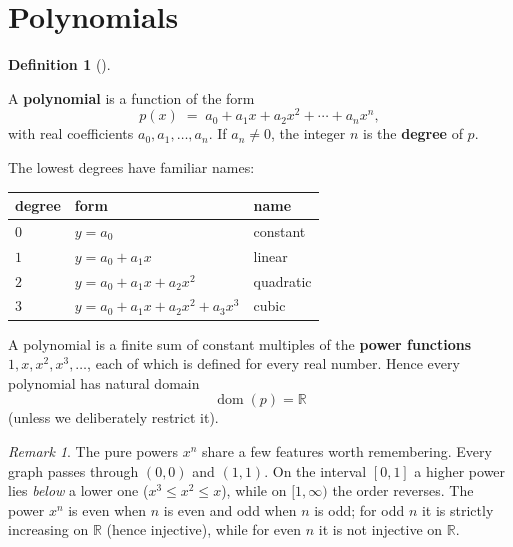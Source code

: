 \documentclass[
  letterpaper,
  DIV=11,
  numbers=noendperiod]{scrreprt}
\newcounter{none} %
\theoremstyle{plain}
\theoremstyle{plain}
\theoremstyle{definition}
\newtheorem{definition}{Definition}[chapter]
\theoremstyle{definition}
\theoremstyle{definition}
\theoremstyle{plain}
\theoremstyle{plain}
\theoremstyle{remark}
\newtheorem{refremark}{Remark}[chapter]
\begin{document}
\section{Polynomials}\label{polynomials}

\begin{definition}[]\protect\hypertarget{def-polynomial}{}\label{def-polynomial}

\hfill\break
A \textbf{polynomial} is a function of the form \[
p(x) \;=\; a_0 + a_1 x + a_2 x^2 + \cdots + a_n x^n,
\] with real coefficients \(a_0,a_1,\dots,a_n\). If \(a_n\neq 0\), the
integer \(n\) is the \textbf{degree} of \(p\).

\end{definition}

The lowest degrees have familiar names:

{\def\LTcaptype{none} %
\begin{longtable}[]{@{}lll@{}}
\toprule\noalign{}
degree & form & name \\
\midrule\noalign{}
\endhead
\bottomrule\noalign{}
\endlastfoot
\(0\) & \(y = a_0\) & constant \\
\(1\) & \(y = a_0 + a_1 x\) & linear \\
\(2\) & \(y = a_0 + a_1 x + a_2 x^2\) & quadratic \\
\(3\) & \(y = a_0 + a_1 x + a_2 x^2 + a_3 x^3\) & cubic \\
\end{longtable}
}

A polynomial is a finite sum of constant multiples of the \textbf{power
functions} \(1, x, x^2, x^3,\dots\), each of which is defined for every
real number. Hence every polynomial has natural domain \[
\operatorname{dom}(p) = \mathbb{R}
\] (unless we deliberately restrict it).

\begin{refremark}
The pure powers \(x^n\) share a few features worth remembering. Every
graph passes through \((0,0)\) and \((1,1)\). On the interval \([0,1]\)
a higher power lies \emph{below} a lower one (\(x^3 \le x^2 \le x\)),
while on \([1,\infty)\) the order reverses. The power \(x^n\) is even
when \(n\) is even and odd when \(n\) is odd; for odd \(n\) it is
strictly increasing on \(\mathbb{R}\) (hence injective), while for even
\(n\) it is not injective on \(\mathbb{R}\).

\label{rem-powers-of-x}

\end{refremark}
\end{document}
